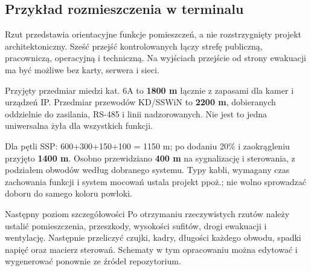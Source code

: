 \subsection{Przykład rozmieszczenia w terminalu}
Rzut przedstawia orientacyjne funkcje pomieszczeń, a nie rozstrzygnięty projekt architektoniczny. Sześć przejść kontrolowanych łączy strefę publiczną, pracowniczą, operacyjną i techniczną. Na wyjściach przejście od strony ewakuacji ma być możliwe bez karty, serwera i sieci.

Przyjęty przedmiar miedzi kat. 6A to \textbf{1800 m} łącznie z zapasami dla kamer i urządzeń IP. Przedmiar przewodów KD/SSWiN to \textbf{2200 m}, dobieranych oddzielnie do zasilania, RS-485 i linii nadzorowanych. Nie jest to jedna uniwersalna żyła dla wszystkich funkcji.

Dla pętli SSP: 600+300+150+100 = 1150 m; po dodaniu 20\% i zaokrągleniu przyjęto \textbf{1400 m}. Osobno przewidziano \textbf{400 m} na sygnalizację i sterowania, z podziałem obwodów według dobranego systemu. Typy kabli, wymagany czas zachowania funkcji i system mocowań ustala projekt ppoż.; nie wolno sprowadzać doboru do samego koloru powłoki.

\begin{note}{Następny poziom szczegółowości}
Po otrzymaniu rzeczywistych rzutów należy ustalić pomieszczenia, przeszkody, wysokości sufitów, drogi ewakuacji i wentylację. Następnie przeliczyć czujki, kadry, długości każdego obwodu, spadki napięć oraz macierz sterowań. Schematy w tym opracowaniu można edytować i wygenerować ponownie ze źródeł repozytorium.
\end{note}
